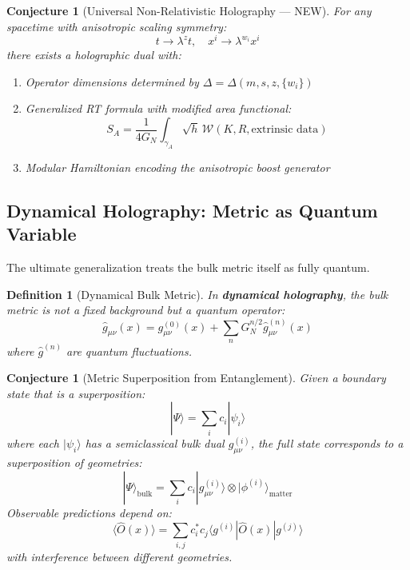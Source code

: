 \documentclass[12pt,a4paper]{article}
\newtheorem{conjecture}[theorem]{Conjecture}
\newtheorem{definition}[theorem]{Definition}
\begin{document}
\begin{conjecture}[Universal Non-Relativistic Holography --- NEW]
For any spacetime with anisotropic scaling symmetry:
\begin{equation}
t \to \lambda^z t, \quad x^i \to \lambda^{w_i} x^i
\end{equation}
there exists a holographic dual with:
\begin{enumerate}
    \item Operator dimensions determined by $\Delta = \Delta(m, s, z, \{w_i\})$
    \item Generalized RT formula with modified area functional:
    \begin{equation}
    S_A = \frac{1}{4G_N} \int_{\gamma_A} \sqrt{h} \, \mathcal{W}(K, R, \text{extrinsic data})
    \end{equation}
    \item Modular Hamiltonian encoding the anisotropic boost generator
\end{enumerate}
\end{conjecture}

\subsection{Dynamical Holography: Metric as Quantum Variable}

The ultimate generalization treats the bulk metric itself as fully quantum.

\begin{definition}[Dynamical Bulk Metric]
In \textbf{dynamical holography}, the bulk metric is not a fixed background but a quantum operator:
\begin{equation}
\hat{g}_{\mu\nu}(x) = g^{(0)}_{\mu\nu}(x) + \sum_n G_N^{n/2} \hat{g}^{(n)}_{\mu\nu}(x)
\end{equation}
where $\hat{g}^{(n)}$ are quantum fluctuations.
\end{definition}

\begin{conjecture}[Metric Superposition from Entanglement]
Given a boundary state that is a superposition:
\begin{equation}
|\Psi\rangle = \sum_i c_i |\psi_i\rangle
\end{equation}
where each $|\psi_i\rangle$ has a semiclassical bulk dual $g^{(i)}_{\mu\nu}$, the full state corresponds to a \textit{superposition of geometries}:
\begin{equation}
|\Psi\rangle_{\text{bulk}} = \sum_i c_i |g^{(i)}_{\mu\nu}\rangle \otimes |\phi^{(i)}\rangle_{\text{matter}}
\end{equation}
Observable predictions depend on:
\begin{equation}
\langle \hat{O}(x) \rangle = \sum_{i,j} c_i^* c_j \langle g^{(i)} | \hat{O}(x) | g^{(j)} \rangle
\end{equation}
with interference between different geometries.
\end{conjecture}
\end{document}
